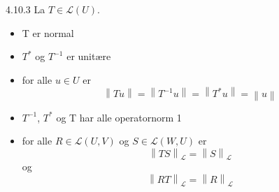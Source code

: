 \documentclass[a4paper,norsk]{article}
\begin{document}
\begin{propositionbox}{4.10.3}{}
La $ T \in \mathcal{L}(U) $.
\begin{itemize}
    \item T er normal
    \item $ T^* $ og $ T^{-1} $  er unitære
    \item for alle $ u \in U $ er
    \[
        \left\lVert Tu \right\rVert = \left\lVert T^{-1}u \right\rVert = \left\lVert T^* u \right\rVert = \left\lVert  u \right\rVert 
    \]
    \item $ T^{-1} $, $ T^* $ og T har alle operatornorm 1
    \item for alle $ R \in \mathcal{L}(U, V) $ og $ S \in \mathcal{L} (W, U) $ er 
    \[
        \left\lVert TS \right\rVert _{ \mathcal{L}} = \left\lVert S \right\rVert_{ \mathcal{L}} 
    \]
    og \[
        \left\lVert RT \right\rVert _{ \mathcal{L}}= \left\lVert R \right\rVert _{ \mathcal{L}}
    \]
    
        
      
\end{itemize} 
\end{propositionbox}
\end{document}
